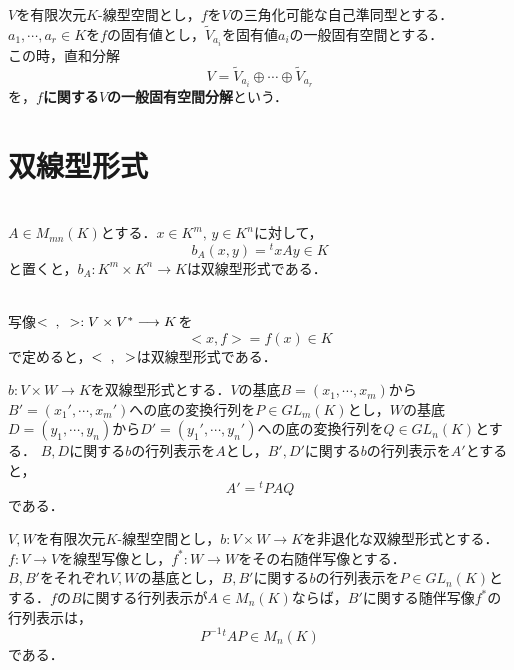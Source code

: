 \documentclass[uplatex, dvipdfmx]{jsreport}
\begin{document}
\begin{definition}
    $V$を有限次元$K$-線型空間とし，$f$を$V$の三角化可能な自己準同型とする．$a_1,\cdots,a_r\in K$を$f$の固有値とし，$\widetilde{V}_{a_i}$を固有値$a_i$の一般固有空間とする．\\ この時，直和分解
    $$V=\widetilde{V}_{a_i}\oplus\cdots\oplus\widetilde{V}_{a_r}$$
    を，\textbf{$f$に関する$V$の一般固有空間分解}という．
\end{definition}

\clearpage

\chapter{双線型形式}

\begin{definition}[行列Aが定める双線型形式]　\\
    $A\in M_{mn}(K)$とする．$x\in K^m,\,y\in K^n$に対して，$$b_A(x,y)={}^txAy\in K$$と置くと，$b_A:K^m\times K^n\longrightarrow K$は双線型形式である．
\end{definition}
\begin{definition}[標準双線型形式]　\\
    写像$<\hspace{2mm},\hspace{2mm}>:V\times V^*\longrightarrow K$を$$<x,f>=f(x)\in K$$で定めると，$<\hspace{2mm},\hspace{2mm}>$は双線型形式である．
\end{definition}

\begin{proposition}
    $b:V\times W\longrightarrow K$を双線型形式とする．$V$の基底$B=(x_1,\cdots,x_m)$から$B'=(x_1',\cdots,x_m')$への底の変換行列を$P\in GL_m(K)$とし，$W$の基底$D=(y_1,\cdots,y_n)$から$D'=(y_1',\cdots,y_n')$への底の変換行列を$Q\in GL_n(K)$とする．
    $B,D$に関する$b$の行列表示を$A$とし，$B',D'$に関する$b$の行列表示を$A'$とすると，$$A'={}^tPAQ$$である．
\end{proposition}

\begin{proposition}[転置と随伴関手]
    $V,W$を有限次元$K$-線型空間とし，$b:V\times W\longrightarrow K$を非退化な双線型形式とする．$f:V\longrightarrow V$を線型写像とし，$f^*:W\longrightarrow W$をその右随伴写像とする．\\
    $B,B'$をそれぞれ$V,W$の基底とし，$B,B'$に関する$b$の行列表示を$P\in GL_n(K)$とする．$f$の$B$に関する行列表示が$A\in M_n(K)$ならば，$B'$に関する随伴写像$f^*$の行列表示は，
    $$P^{-1}{}^tAP\in M_n(K)$$
    である．
\end{proposition}
\end{document}
